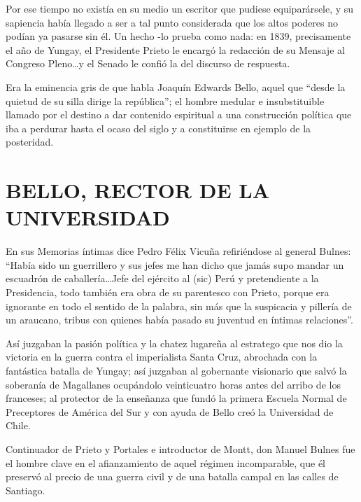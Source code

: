 \documentclass[10pt,twoside,openright]{memoir}
\begin{document}
Por ese tiempo no existía en su medio un escritor que pudiese
equiparársele, y su sapiencia había llegado a ser a tal punto
considerada que los altos poderes no podían ya pasarse sin él. Un hecho
-lo prueba como nada: en 1839, precisamente el año de Yungay, el
Presidente Prieto le encargó la redacción de su Mensaje al Congreso
Pleno\ldots y el Senado le confió la del discurso de respuesta.

Era la eminencia gris de que habla Joaquín Edwards Bello, aquel que
``desde la quietud de su silla dirige la república''; el hombre medular e
insubstituible llamado por el destino a dar contenido espiritual a una
construcción política que iba a perdurar hasta el ocaso del siglo y a
constituirse en ejemplo de la posteridad.

\chapter{BELLO, RECTOR DE LA UNIVERSIDAD}

En sus Memorias íntimas dice Pedro Félix Vicuña refiriéndose al general
Bulnes: ``Había sido un guerrillero y sus jefes me han dicho que jamás
supo mandar un escuadrón de caballería\ldots Jefe del ejército al (sic)
Perú y pretendiente a la Presidencia, todo también era obra de su
parentesco con Prieto, porque era ignorante en todo el sentido de la
palabra, sin más que la suspicacia y pillería de un araucano, tribus con
quienes había pasado su juventud en íntimas relaciones''.

Así juzgaban la pasión política y la chatez lugareña al estratego que
nos dio la victoria en la guerra contra el imperialista Santa Cruz,
abrochada con la fantástica batalla de Yungay; así juzgaban al
gobernante visionario que salvó la soberanía de Magallanes ocupándolo
veinticuatro horas antes del arribo de los franceses; al protector de la
enseñanza que fundó la primera Escuela Normal de Preceptores de América
del Sur y con ayuda de Bello creó la Universidad de Chile.

Continuador de Prieto y Portales e introductor de Montt, don Manuel
Bulnes fue el hombre clave en el afianzamiento de aquel régimen
incomparable, que él preservó al precio de una guerra civil y de una
batalla campal en las calles de Santiago.
\end{document}
